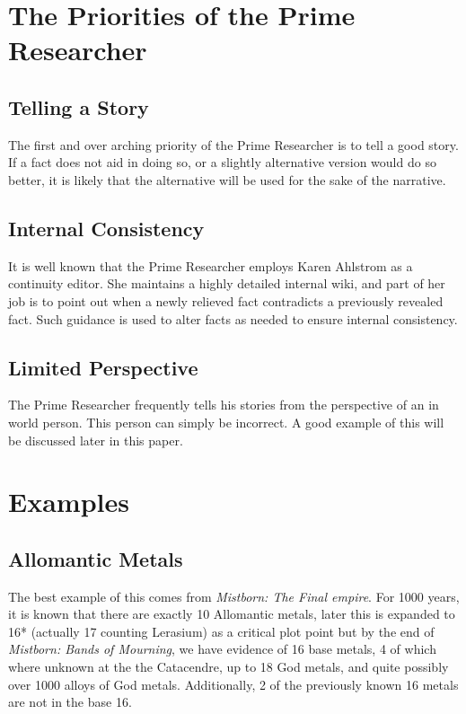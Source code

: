 \documentclass[conference]{IEEEtran}
\begin{document}
\section{The Priorities of the Prime Researcher}

\subsection{Telling a Story}
The first and over arching priority of the Prime Researcher is to tell a good story.  If a fact does not aid in doing so, or a slightly alternative version would do so better, it is likely that the alternative will be used for the sake of the narrative.
\subsection{Internal Consistency}

It is well known that the Prime Researcher employs Karen Ahlstrom as a continuity editor. \cite{consistency}\cite{karen}  She maintains a highly detailed internal wiki, and part of her job is to point out when a newly relieved fact contradicts a previously revealed fact.  Such guidance is used to alter facts as needed to ensure internal consistency.

\subsection{Limited Perspective}
The Prime Researcher frequently tells his stories from the perspective of an in world person.  This person can simply be incorrect.  A good example of this will be discussed later in this paper.


\section{Examples}
\subsection*{Allomantic Metals}
The best example of this comes from \emph{Mistborn: The Final empire}.  For 1000 years, it is known that there are exactly 10 Allomantic metals,\cite{kelsier} later this is expanded to 16* (actually 17 counting Lerasium) as a critical plot point\cite{16-metals} but by the end of \emph{Mistborn: Bands of Mourning}, we have evidence of 16 base metals, 4 of which where unknown at the the Catacendre, up to 18 God metals, and quite possibly over 1000 alloys of God metals. \cite{bands}\cite{larasium}\cite{dor}  Additionally, 2 of the previously known 16 metals are not in the base 16.\cite{nalatium}
\end{document}
